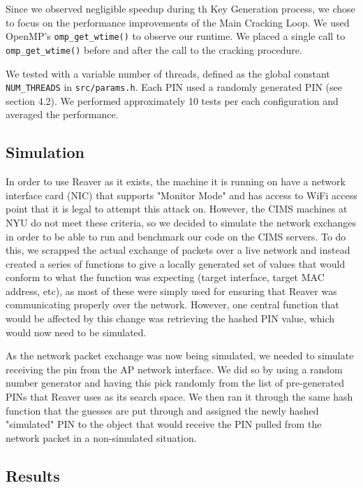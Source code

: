 \documentclass[a4paper]{article}
\begin{document}
Since we observed negligible speedup during th Key Generation process, we chose to focus on the
performance improvements of the Main Cracking Loop. We used OpenMP's \verb+omp_get_wtime()+ to observe
our runtime. We placed a single call to \verb+omp_get_wtime()+ before and after the call to the 
cracking procedure.

We tested with a variable number of threads, defined as the global constant \verb+NUM_THREADS+ in
\texttt{src/params.h}. Each PIN used a randomly generated PIN (see section 4.2). We performed
approximately 10 tests per each configuration and averaged the performance.

\subsection{Simulation}
In order to use Reaver as it exists, the machine it is running on have a network interface card (NIC) that supports "Monitor Mode" and has access to WiFi access point that it is legal to attempt this attack on. However, the CIMS machines at NYU do not meet these criteria, so we decided to simulate the network exchanges in order to be able to run and benchmark our code on the CIMS servers. To do this, we scrapped the actual exchange of packets over a live network and instead created a series of functions to give a locally generated set of values that would conform to what the function was expecting (target interface, target MAC address, etc), as most of these were simply used for ensuring that Reaver was communicating properly over the network. However, one central function that would be affected by this change was retrieving the hashed PIN value, which would now need to be simulated.

As the network packet exchange was now being simulated, we needed to simulate receiving the pin from the AP network interface. We did so by using a random number generator and having this pick randomly from the list of pre-generated PINs that Reaver uses as its search space. We then ran it through the same hash function that the guesses are put through and assigned the newly hashed "simulated" PIN to the object that would receive the PIN pulled from the network packet in a non-simulated situation.

\subsection{Results}
\end{document}
